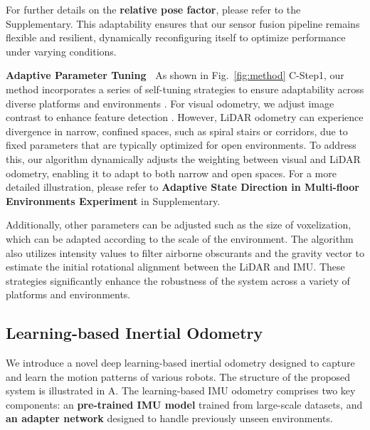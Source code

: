 For further details on the \textbf{relative pose factor}, please refer to the Supplementary. This adaptability ensures that our sensor fusion pipeline remains flexible and resilient, dynamically reconfiguring itself to optimize performance under varying conditions.



\textbf{Adaptive Parameter Tuning~}
As shown in Fig.~\ref{fig:method} C-Step1, our method incorporates a series of self-tuning strategies to ensure adaptability across diverse platforms and environments \cite{ramezani2022wildcat} \cite{lim2023adalio}. For visual odometry, we adjust image contrast to enhance feature detection \cite{bergmann2017online}. However, LiDAR odometry can experience divergence in narrow, confined spaces, such as spiral stairs or corridors, due to fixed parameters that are typically optimized for open environments. To address this, our algorithm dynamically adjusts the weighting between visual and LiDAR odometry, enabling it to adapt to both narrow and open spaces. For a more detailed illustration, please refer to \textbf{Adaptive State Direction in Multi-floor Environments Experiment} in Supplementary.

Additionally, other parameters can be adjusted such as the size of voxelization, which can be adapted according to the scale of the environment. The algorithm also utilizes intensity values to filter airborne obscurants\cite{best2022resilient} and the gravity vector to estimate the initial rotational alignment between the LiDAR and IMU\cite{nemiroff2023joint}. These strategies significantly enhance the robustness of the system across a variety of platforms and environments. 




\subsection{Learning-based Inertial Odometry} 

We introduce a novel deep learning-based inertial odometry designed to capture and learn the motion patterns of various robots. The structure of the proposed system is illustrated in  A. The learning-based IMU odometry comprises two key components: an \textbf{pre-trained IMU model} trained from large-scale datasets, and \textbf{an adapter network} designed to handle previously unseen environments.

